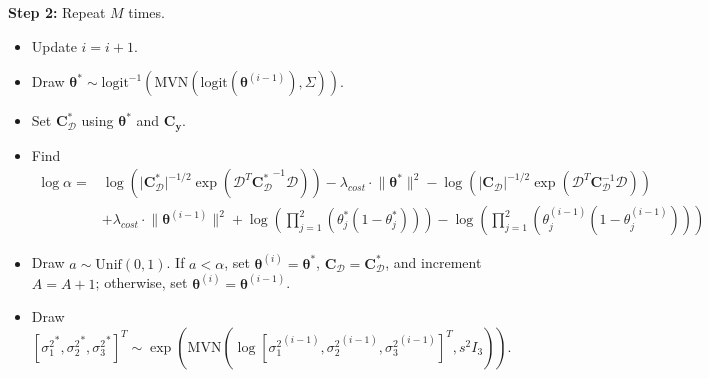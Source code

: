 \documentclass{article}
\begin{document}
\begin{appendices}
\begin{algorithm}
\textbf{Step 2:} Repeat $M$ times.
\begin{itemize}
\item Update $i = i+1$.
\item Draw $\boldsymbol \theta ^* \sim \mathrm{logit}^{-1}\left( \mathrm{MVN}(\mathrm{logit}(\boldsymbol \theta^{(i-1)}),\Sigma)\right)$.
\item Set $\mathbf C_{\mathcal D}^*$ using $\boldsymbol\theta^*$ and $\mathbf C_{\mathbf y}$.
\item Find 
\begin{align*}
\log \alpha = &
\log \left( \lvert \mathbf C^*_{\mathcal D}\rvert^{-1/2} \exp(\mathcal D^T \mathbf {C_{\mathcal D}^*}^{-1}\mathcal D) \right) - 
\lambda_{cost} \cdot \lVert \boldsymbol\theta^*\rVert^2 - 
\log \left( \lvert \mathbf C_{\mathcal D}\rvert^{-1/2} \exp(\mathcal D^T \mathbf C_{\mathcal D}^{-1}\mathcal D) \right)  \\&+
\lambda_{cost} \cdot \lVert \boldsymbol\theta^{(i-1)}\rVert^2 +
\log \left ( \prod_{j=1}^2 \left( \theta^*_j(1-\theta_j^*) \right) \right ) - 
\log \left (  \prod_{j=1}^2 \left( \theta^{(i-1)}_j(1-\theta_j^{(i-1)}) \right) \right )
\end{align*}
\item Draw $a\sim \mathrm{Unif}(0,1)$. If $a<\alpha$, set $\boldsymbol\theta^{(i)}=\boldsymbol\theta^*$, $\mathbf C_{\mathcal D} = \mathbf C_{\mathcal D}^*$, and increment $A=A+1$; otherwise, set $\boldsymbol\theta^{(i)} = \boldsymbol\theta^{(i-1)}$.
\item Draw $[{\sigma_1^2}^*, {\sigma_2^2}^*, {\sigma_3^2}^*]^T \sim \exp \left ( \mathrm {MVN}\left( \log\left[{\sigma_1^2}^{(i-1)}, {\sigma_2^2}^{(i-1)}, {\sigma_3^2}^{(i-1)} \right]^T, s^2I_3 \right) \right)$.

\end{itemize}
\end{algorithm}
\end{appendices}
\end{document}
